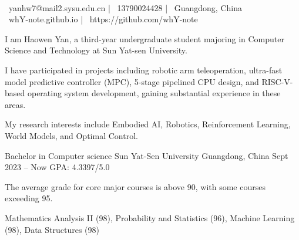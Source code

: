 \documentclass[]{awesome-cv}
\begin{document}
    
\begin{center}
	  \\
	\vspace{2mm}
	{\faEnvelope\ yanhw7@mail2.sysu.edu.cn} | {\faMobile\ 13790024428} | {\faMapMarker\ Guangdong, China} \\
	{\faLink\ whY-note.github.io} | {\faGithub\ https://github.com/whY-note}
\end{center}



I am Haowen Yan, a third-year undergraduate student majoring in Computer Science and Technology at Sun Yat-sen University.

I have participated in projects including robotic arm teleoperation, ultra-fast model predictive controller (MPC), 5-stage pipelined CPU design, and RISC-V-based operating system development, gaining substantial experience in these areas.

My research interests include Embodied AI, Robotics, Reinforcement Learning, World Models, and Optimal Control.


\begin{cventries}
	\cventry
	{Bachelor in Computer science}
	{Sun Yat-Sen University}
	{Guangdong, China}
	{Sept 2023 – Now}
	{GPA: 4.3397/5.0}

\end{cventries}

The average grade for core major courses is above 90, with some courses exceeding 95.
	
Mathematics Analysis II (98), Probability and Statistics (96), Machine Learning (98), Data Structures (98)
\end{document}
